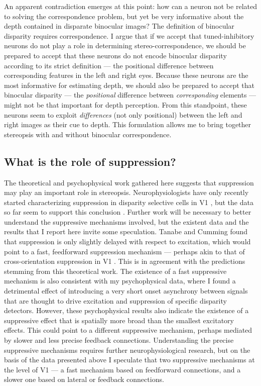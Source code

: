 An apparent contradiction emerges at this point: how can a neuron not be related to solving the correspondence problem, but yet be very informative about the depth contained in disparate binocular images? The definition of binocular disparity requires correspondence. I argue that if we accept that tuned-inhibitory neurons do not play a role in determining stereo-correspondence, we should be prepared to accept that these neurons do not encode binocular disparity according to its strict definition --- the positional difference between corresponding features in the left and right eyes. Because these neurons are the most informative for estimating depth, we should also be prepared to accept that binocular disparity --- the \textit{positional} difference between \textit{corresponding} elements --- might not be that important for depth perception. From this standpoint, these neurons seem to exploit \textit{differences} (not only positional) between the left and right images as their cue to depth. This formulation allows me to bring together stereopsis with and without binocular correspondence.


\subsection*{What is the role of suppression?}

The theoretical and psychophysical work gathered here suggests that suppression may play an important role in stereopsis. Neurophysiologists have only recently started characterizing suppression in disparity selective cells in V1 \cite{Tanabe:2011pt,Tanabe:2014ud}, but the data so far seem to support this conclusion \cite{Tanabe:2011pt}. Further work will be necessary to better understand the suppressive mechanisms involved, but the existent data and the results that I report here invite some speculation. Tanabe and Cumming found that suppression is only slightly delayed with respect to excitation, which would point to a fast, feedforward suppression mechanism --- perhaps akin to that of cross-orientation suppression in V1 \cite{Smith:2006uq}. This is in agreement with the predictions stemming from this theoretical work. The existence of a fast suppressive mechanism is also consistent with my psychophysical data, where I found a detrimental effect of introducing a very short onset asynchrony between signals that are thought to drive excitation and suppression of specific disparity detectors. However, these psychophysical results also indicate the existence of a suppressive effect that is spatially more broad than the smallest excitatory effects. This could point to a different suppressive mechanism, perhaps mediated by slower and less precise feedback connections. Understanding the precise suppressive mechanisms requires further neurophysiological research, but on the basis of the data presented above I speculate that two suppressive mechanisms at the level of V1 --- a fast mechanism based on feedforward connections, and a slower one based on lateral or feedback connections.



